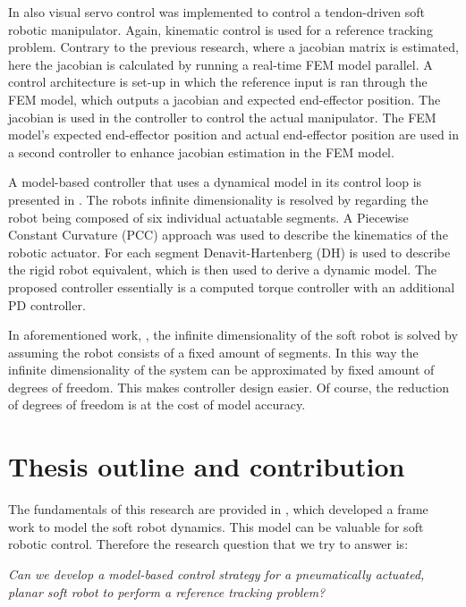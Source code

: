 In \cite{zhang2017visual} also visual servo control was implemented to control a tendon-driven soft robotic manipulator. Again, kinematic control is used for a reference tracking problem. Contrary to the previous research, where a jacobian matrix is estimated, here the jacobian is calculated by running a real-time FEM model parallel. A control architecture is set-up in which the reference input is ran through the FEM model, which outputs a jacobian and expected end-effector position. The jacobian is used in the controller to control the actual manipulator. The FEM model's expected end-effector position and actual end-effector position are used in a second controller to enhance jacobian estimation in the FEM model.

A model-based controller that uses a dynamical model in its control loop is presented in \cite{della2020model}. The robots infinite dimensionality is resolved by regarding the robot being composed of six individual actuatable segments. A Piecewise Constant Curvature (PCC) approach was used to describe the kinematics of the robotic actuator. For each segment Denavit-Hartenberg (DH) is used to describe the rigid robot equivalent, which is then used to derive a dynamic model. The proposed controller essentially is a computed torque controller with an additional PD controller. 

In aforementioned work, \cite{della2020model}, the infinite dimensionality of the soft robot is solved by assuming the robot consists of a fixed amount of segments. In this way the infinite dimensionality of the system can be approximated by fixed amount of degrees of freedom. This makes controller design easier. Of course, the reduction of degrees of freedom is at the cost of model accuracy. 



\section*{Thesis outline and contribution}


The fundamentals of this research are provided in \cite{Caasenbrood2020}, which developed a frame work to model the soft robot dynamics. This model can be valuable for soft robotic control. Therefore the research question that we try to answer is:

\textit{Can we develop a model-based control strategy for a pneumatically actuated, planar soft robot to perform a reference tracking problem?}

